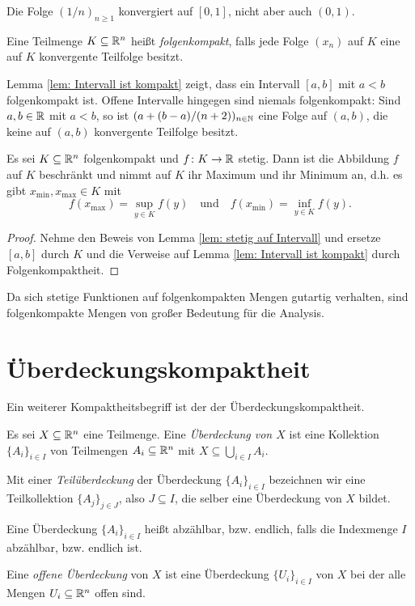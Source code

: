 \documentclass[a4paper,10pt]{article}
\begin{document}
\begin{bsp}
 Die Folge $(1/n)_{n \geq 1}$ konvergiert auf $[0,1]$, nicht aber auch $(0,1)$.
\end{bsp}



\begin{defi}
 Eine Teilmenge $K \subseteq \mathbb{R}^n$ heißt \emph{folgenkompakt}, falls jede Folge $(x_n)$ auf $K$ eine auf $K$ konvergente Teilfolge besitzt.
\end{defi}


\begin{bsp}
 Lemma \ref{lem: Intervall ist kompakt} zeigt, dass ein Intervall $[a,b]$ mit $a < b$ folgenkompakt ist. Offene Intervalle hingegen sind niemals folgenkompakt: Sind $a,b \in \mathbb{R}$ mit $a < b$, so ist $(a + (b-a)/(n+2))_{n \in \mathbb{N}}$ eine Folge auf $(a,b)$, die keine auf $(a,b)$ konvergente Teilfolge besitzt.
\end{bsp}


\begin{prop}
 Es sei $K \subseteq \mathbb{R}^n$ folgenkompakt und $f \colon K \to \mathbb{R}$ stetig. Dann ist die Abbildung $f$ auf $K$ beschränkt und nimmt auf $K$ ihr Maximum und ihr Minimum an, d.h. es gibt $x_{\text{min}}, x_{\text{max}} \in K$ mit
 \[
  f(x_{\text{max}}) = \sup_{y \in K} f(y)
  \quad
  \text{und}
  \quad
  f(x_{\text{min}}) = \inf_{y \in K} f(y).
 \]
\end{prop}
\begin{proof}
 Nehme den Beweis von Lemma \ref{lem: stetig auf Intervall} und ersetze $[a,b]$ durch $K$ und die Verweise auf Lemma \ref{lem: Intervall ist kompakt} durch Folgenkompaktheit.
\end{proof}


Da sich stetige Funktionen auf folgenkompakten Mengen gutartig verhalten, sind folgenkompakte Mengen von großer Bedeutung für die Analysis.





\section{Überdeckungskompaktheit}
Ein weiterer Kompaktheitsbegriff ist der der Überdeckungskompaktheit.


\begin{defi}
 Es sei $X \subseteq \mathbb{R}^n$ eine Teilmenge. Eine \emph{Überdeckung von $X$} ist eine Kollektion $\{A_i\}_{i \in I}$ von Teilmengen $A_i \subseteq \mathbb{R}^n$ mit $X \subseteq \bigcup_{i \in I} A_i$.
 
 Mit einer \emph{Teilüberdeckung} der Überdeckung $\{A_i\}_{i \in I}$ bezeichnen wir eine Teilkollektion $\{A_j\}_{j \in J}$, also $J \subseteq I$, die selber eine Überdeckung von $X$ bildet.
 
 Eine Überdeckung $\{A_i\}_{i \in I}$ heißt abzählbar, bzw. endlich, falls die Indexmenge $I$ abzählbar, bzw. endlich ist.
 
 Eine \emph{offene Überdeckung} von $X$ ist eine Überdeckung $\{U_i\}_{i \in I}$ von $X$ bei der alle Mengen $U_i \subseteq \mathbb{R}^n$ offen sind.
\end{defi}
\end{document}
